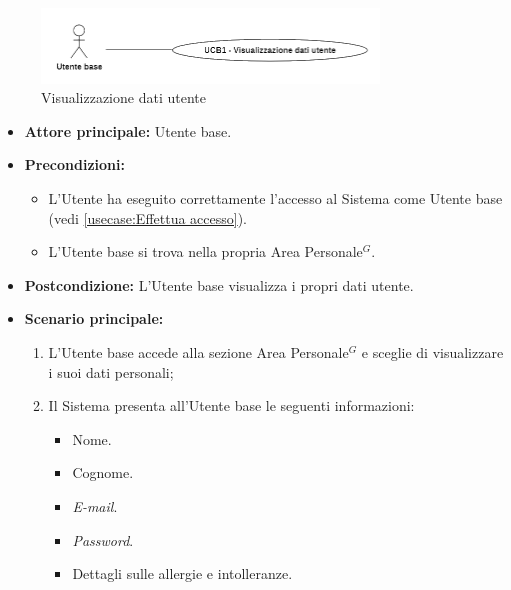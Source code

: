 \label{usecase:Visualizzazione dati utente}

\begin{figure}[h]
	\centering
	\includegraphics[width=0.8\textwidth]{./uml/UCB1.png} 
	\caption{Visualizzazione dati utente}
	\label{fig:UCB1}
  \end{figure}


\begin{itemize}
	\item \textbf{Attore principale:} Utente base.

	\item \textbf{Precondizioni:}
	      \begin{itemize}
		      \item L'Utente ha eseguito correttamente l'accesso al Sistema come
		            Utente base (vedi \autoref{usecase:Effettua accesso}).
		      \item L'Utente base si trova nella propria Area Personale$^G$.
	      \end{itemize}

	\item \textbf{Postcondizione:} L'Utente base visualizza i propri dati utente.

	\item \textbf{Scenario principale:}
	      \begin{enumerate}
		      \item L'Utente base accede alla sezione Area Personale$^G$ e sceglie di visualizzare i suoi dati personali;
		      \item Il Sistema presenta all'Utente base le seguenti informazioni:
		            \begin{itemize}
			            \item Nome.
			            \item Cognome.
			            \item \textit{E-mail}.
			            \item \textit{Password}.
			            \item Dettagli sulle allergie e intolleranze.
		            \end{itemize}
	      \end{enumerate}
\end{itemize}
